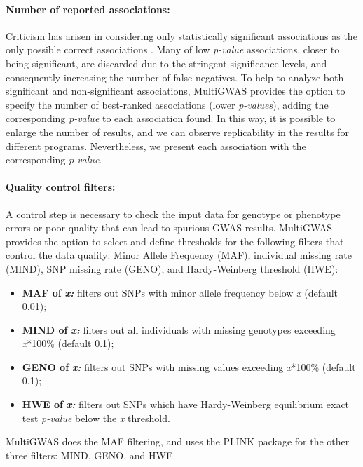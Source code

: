 \documentclass{article}
\begin{document}
\paragraph{Number of reported associations: }

Criticism has arisen in considering only statistically significant associations as the only possible correct associations \cite{Thomson2011,Kaler2019}. Many of low \emph{p-value} associations, closer to being significant, are discarded due to the stringent significance levels, and consequently increasing the number of false negatives. To help to analyze both significant and non-significant associations, MultiGWAS provides the option to specify the number of best-ranked associations (lower \emph{p-values}), adding the corresponding \emph{p-value} to each association found. In this way, it is possible to enlarge the number of results, and we can observe replicability in the results for different programs. Nevertheless, we present each association with the corresponding \emph{p-value}.


\paragraph{Quality control filters:}

A control step is necessary to check the input data for genotype or phenotype errors or poor quality that can lead to spurious GWAS results. MultiGWAS provides the option to select and define thresholds for the following filters that control the data quality: Minor Allele Frequency (MAF), individual missing rate (MIND), SNP missing rate (GENO), and Hardy-Weinberg threshold (HWE):
\begin{itemize}
\item \textbf{MAF of }\textbf{\emph{x:}} filters out SNPs with minor allele frequency below \emph{x} (default 0.01); 
\item \textbf{MIND of }\textbf{\emph{x:}} filters out all individuals with missing genotypes exceeding \emph{x}{*}100\% (default 0.1); 
\item \textbf{GENO of }\textbf{\emph{x:}} filters out SNPs with missing values exceeding \emph{x}{*}100\% (default 0.1); 
\item \textbf{HWE of }\textbf{\emph{x:}} filters out SNPs which have Hardy-Weinberg equilibrium exact test \emph{p-value} below the \emph{x} threshold.
\end{itemize}
MultiGWAS does the MAF filtering, and uses the PLINK package \cite{Gumpinger2018} for the other three filters: MIND, GENO, and HWE.
\end{document}

